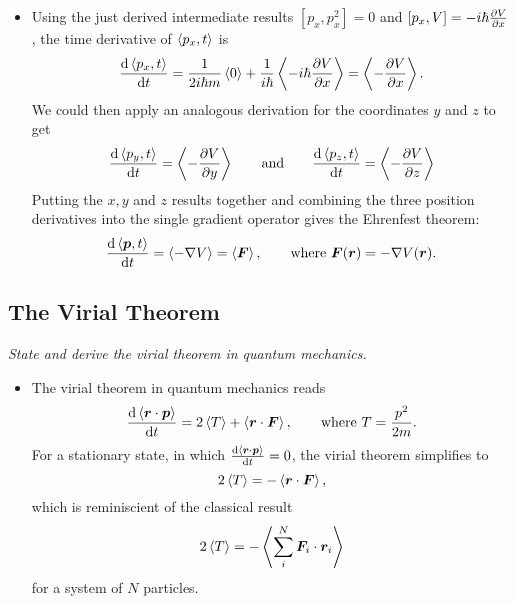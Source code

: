 \documentclass[11pt, a4paper]{article}
\renewcommand{\grad}{\nabla}
\newcommand{\eqtext}[1]{\qquad \text{#1} \qquad}
\renewcommand{\vec}[1]{\bm{#1}}  %
\renewcommand{\r}{\vec{r}}  %
\begin{document}
\begin{itemize}
	\item Using the just derived intermediate results $  [p_{x}, p_{x}^{2}] = 0 $  and $ [p_{x}, V] = - i \hbar \pdv{V}{x} $, the time derivative of $ \ev{p_{x}, t} $ is 
	\begin{equation*}
		\dv{\ev{p_{x}, t}}{t} = \frac{1}{2i \hbar m}\ev{0} + \frac{1}{i\hbar} \ev{- i \hbar \pdv{V}{x}} = \ev{-\pdv{V}{x}}.
	\end{equation*}
	We could then apply an analogous derivation for the coordinates $ y $ and $ z $ to get
	\begin{equation*}
		\dv{\ev{p_{y}, t}}{t} = \ev{-\pdv{V}{y}} \eqtext{and} \dv{\ev{p_{z}, t}}{t} =  \ev{-\pdv{V}{z}}
	\end{equation*}
	Putting the $ x, y $ and $ z $ results together and combining the three position derivatives into the single gradient operator gives the Ehrenfest theorem:
	\begin{equation*}
		\dv{\ev{\vec{p}, t}}{t} = \ev{-\grad V} = \ev{\vec{F}}, \qquad \text{where } \vec{F}(\r) = - \grad V(\r).
	\end{equation*}
	
\end{itemize}

\subsection{The Virial Theorem}
\textit{State and derive the virial theorem in quantum mechanics.}

\begin{itemize}
    \item The virial theorem in quantum mechanics reads
    \begin{equation*}
        \dv{\ev{\r \cdot \vec{p}}}{t} = 2 \ev{T} + \ev{\r \cdot \vec{F}}, \qquad \text{where } T = \frac{p^{2}}{2m}.
    \end{equation*}
    For a stationary state, in which $ \dv{\ev{\vec{r} \cdot \vec{p}}}{t} = 0 $, the virial theorem simplifies to
    \begin{equation*}
        2 \ev{T} = - \ev{\r \cdot \vec{F}},
    \end{equation*}
    which is reminiscient of the classical result
    \begin{equation*}
        2 \ev{T} = - \ev{\sum_{i}^{N} \vec{F}_{i} \cdot \r_{i}}
    \end{equation*}
    for a system of $ N $ particles.
    
\end{itemize}
\end{document}
